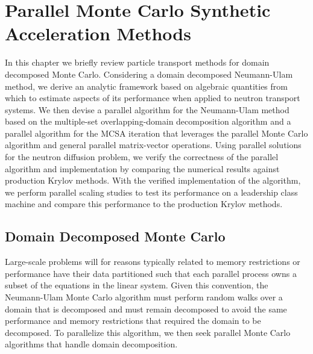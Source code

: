 \chapter{Parallel Monte Carlo Synthetic \\ Acceleration Methods\ }
\label{ch:parallel_methods}

In this chapter we briefly review particle transport methods for
domain decomposed Monte Carlo. Considering a domain decomposed
Neumann-Ulam method, we derive an analytic framework based on
algebraic quantities from which to estimate aspects of its performance
when applied to neutron transport systems. We then devise a parallel
algorithm for the Neumann-Ulam method based on the multiple-set
overlapping-domain decomposition algorithm and a parallel algorithm
for the MCSA iteration that leverages the parallel Monte Carlo
algorithm and general parallel matrix-vector operations. Using
parallel solutions for the neutron diffusion problem, we verify the
correctness of the parallel algorithm and implementation by comparing
the numerical results against production Krylov methods. With the
verified implementation of the algorithm, we perform parallel scaling
studies to test its performance on a leadership class machine and
compare this performance to the production Krylov methods.

\section{Domain Decomposed Monte Carlo\ }
\label{sec:msod}
Large-scale problems will for reasons typically related to memory
restrictions or performance have their data partitioned such that each
parallel process owns a subset of the equations in the linear
system. Given this convention, the Neumann-Ulam Monte Carlo algorithm
must perform random walks over a domain that is decomposed and must
remain decomposed to avoid the same performance and memory
restrictions that required the domain to be decomposed. To parallelize
this algorithm, we then seek parallel Monte Carlo algorithms that
handle domain decomposition.

